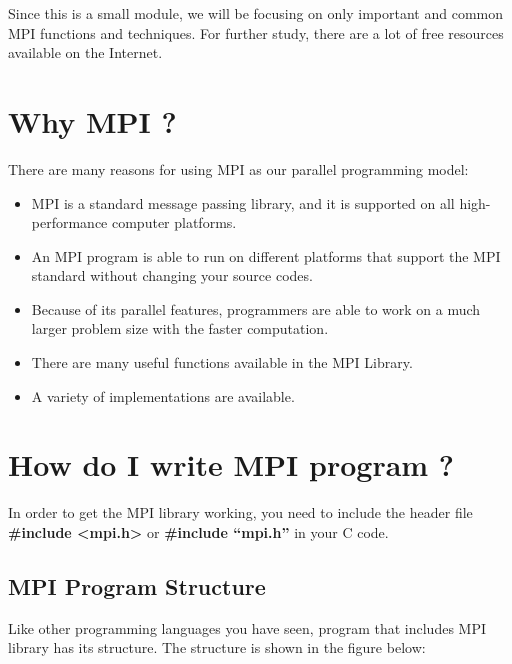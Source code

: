\documentclass[letterpaper,10pt,openany,oneside]{sphinxmanual}
\begin{document}
Since this is a small module, we will be focusing on only important and common MPI functions and techniques. For further study, there are a lot of free resources available on the Internet.


\section{Why MPI ?}
\label{introMPI/introMPI:why-mpi}
There are many reasons for using MPI as our parallel programming model:
\begin{itemize}
\item {} 
MPI is a standard message passing library, and it is supported on all high-performance computer platforms.

\item {} 
An MPI program is able to run on different platforms that support the MPI standard without changing your source codes.

\item {} 
Because of its parallel features, programmers are able to work on a much larger problem size with the faster computation.

\item {} 
There are many useful functions available in the MPI Library.

\item {} 
A variety of implementations are available.

\end{itemize}


\section{How do I write MPI program ?}
\label{introMPI/introMPI:how-do-i-write-mpi-program}
In order to get the MPI library working, you need to include the header file \textbf{\#include \textless{}mpi.h\textgreater{}} or \textbf{\#include “mpi.h”} in your C code.


\subsection{MPI Program Structure}
\label{introMPI/introMPI:mpi-program-structure}
Like other programming languages you have seen, program that includes MPI library has its structure. The structure is shown in the figure below:
\end{document}
